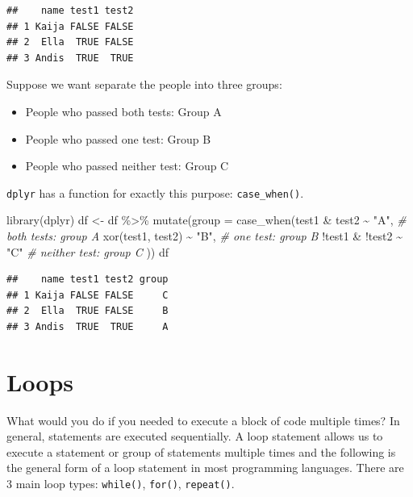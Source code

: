 \documentclass[
]{book}
\newenvironment{Shaded}{\begin{snugshade}}{\end{snugshade}}
\newcommand{\AttributeTok}[1]{\textcolor[rgb]{0.77,0.63,0.00}{#1}}
\newcommand{\CommentTok}[1]{\textcolor[rgb]{0.56,0.35,0.01}{\textit{#1}}}
\newcommand{\FunctionTok}[1]{\textcolor[rgb]{0.00,0.00,0.00}{#1}}
\newcommand{\NormalTok}[1]{#1}
\newcommand{\OtherTok}[1]{\textcolor[rgb]{0.56,0.35,0.01}{#1}}
\newcommand{\SpecialCharTok}[1]{\textcolor[rgb]{0.00,0.00,0.00}{#1}}
\newcommand{\StringTok}[1]{\textcolor[rgb]{0.31,0.60,0.02}{#1}}
\providecommand{\tightlist}{%
  \setlength{\itemsep}{0pt}\setlength{\parskip}{0pt}}
\theoremstyle{definition}
\theoremstyle{definition}
\theoremstyle{definition}
\theoremstyle{definition}
\theoremstyle{remark}
\begin{document}
\begin{verbatim}
##    name test1 test2
## 1 Kaija FALSE FALSE
## 2  Ella  TRUE FALSE
## 3 Andis  TRUE  TRUE
\end{verbatim}

Suppose we want separate the people into three groups:

\begin{itemize}
\tightlist
\item
  People who passed both tests: Group A\\
\item
  People who passed one test: Group B
\item
  People who passed neither test: Group C
\end{itemize}

\texttt{dplyr} has a function for exactly this purpose: \texttt{case\_when()}.

\begin{Shaded}
\begin{Highlighting}[]
\FunctionTok{library}\NormalTok{(dplyr)}
\NormalTok{df }\OtherTok{\textless{}{-}}\NormalTok{ df }\SpecialCharTok{\%\textgreater{}\%} 
\FunctionTok{mutate}\NormalTok{(}\AttributeTok{group =} \FunctionTok{case\_when}\NormalTok{(test1 }\SpecialCharTok{\&}\NormalTok{ test2 }\SpecialCharTok{\textasciitilde{}} \StringTok{"A"}\NormalTok{, }\CommentTok{\# both tests: group A}
                         \FunctionTok{xor}\NormalTok{(test1, test2) }\SpecialCharTok{\textasciitilde{}} \StringTok{"B"}\NormalTok{, }\CommentTok{\# one test: group B}
                         \SpecialCharTok{!}\NormalTok{test1 }\SpecialCharTok{\&} \SpecialCharTok{!}\NormalTok{test2 }\SpecialCharTok{\textasciitilde{}} \StringTok{"C"} \CommentTok{\# neither test: group C}
\NormalTok{))}
\NormalTok{df}
\end{Highlighting}
\end{Shaded}

\begin{verbatim}
##    name test1 test2 group
## 1 Kaija FALSE FALSE     C
## 2  Ella  TRUE FALSE     B
## 3 Andis  TRUE  TRUE     A
\end{verbatim}

\hypertarget{loops}{%
\section{Loops}\label{loops}}

What would you do if you needed to execute a block of code multiple times? In general, statements are executed sequentially. A loop statement allows us to execute a statement or group of statements multiple times and the following is the general form of a loop statement in most programming languages. There are 3 main loop types: \texttt{while()}, \texttt{for()}, \texttt{repeat()}.
\end{document}
